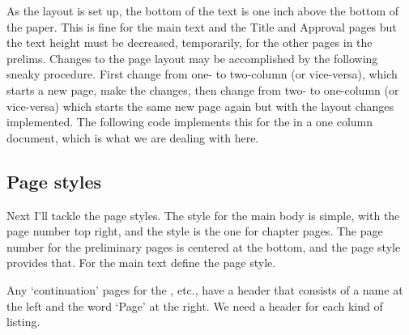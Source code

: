     As the layout is set up, the bottom of the text is one inch above the
bottom of the paper. This is fine for the main text and the Title and Approval
pages but the text height must be decreased, temporarily, for the other
pages in the prelims. Changes to the page layout 
may be accomplished by
the following sneaky procedure.
First change from one- to two-column (or vice-versa), which starts a new 
page, make the changes, then change from two- to one-column (or vice-versa)
which starts the same new page again but with the layout changes implemented.
The following code implements this for the  in a one
column document, which is what we are dealing with here.
\begin{lcode}
\newcommand*{\addtotextheight}[1]{%
  \twocolumn
  \addtolength{\textheight}{#1}%
  \onecolumn}
\end{lcode}

\subsection{Page styles}

    Next I'll tackle the page styles. The style for the main body is simple,
with the page number top right, and the  style is the one for 
chapter pages. The page number for the preliminary pages is centered
at the bottom, and the  page style provides that. For the main
text define the  page style.
\begin{lcode}
\end{lcode}

    Any `continuation' pages for the \toc, etc., have a header that consists 
of a name at the left and the word `Page' at the right. We need a header for
each kind of listing.
\begin{lcode}
\end{lcode}

